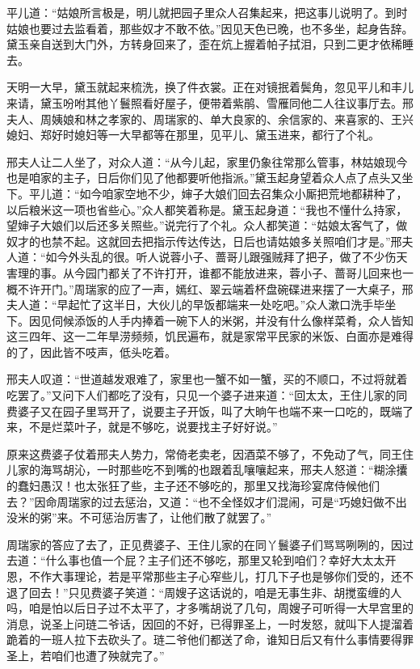 \documentclass[12pt,oneside]{book}
\begin{document}
平儿道：“姑娘所言极是，明儿就把园子里众人召集起来，把这事儿说明了。到时姑娘也要过去监看着，那些奴才不敢不依。”因见天色已晚，也不多坐，起身告辞。黛玉亲自送到大门外，方转身回来了，歪在炕上握着帕子拭泪，只到二更才依稀睡去。

天明一大早，黛玉就起来梳洗，换了件衣裳。正在对镜抿着鬓角，忽见平儿和丰儿来请，黛玉吩咐其他丫鬟照看好屋子，便带着紫鹃、雪雁同他二人往议事厅去。邢夫人、周姨娘和林之孝家的、周瑞家的、单大良家的、余信家的、来喜家的、王兴媳妇、郑好时媳妇等一大早都等在那里，见平儿、黛玉进来，都行了个礼。

邢夫人让二人坐了，对众人道：“从今儿起，家里仍象往常那么管事，林姑娘现今也是咱家的主子，日后你们见了他都要听他指派。”黛玉起身望着众人点了点头又坐下。平儿道：“如今咱家空地不少，婶子大娘们回去召集众小厮把荒地都耕种了，以后粮米这一项也省些心。”众人都笑着称是。黛玉起身道：“我也不懂什么持家，望婶子大娘们以后还多关照些。”说完行了个礼。众人都笑道：“姑娘太客气了，做奴才的也禁不起。这就回去把指示传达传达，日后也请姑娘多关照咱们才是。”邢夫人道：“如今外头乱的很。听人说蓉小子、蔷哥儿跟强贼拜了把子，做了不少伤天害理的事。从今园门都关了不许打开，谁都不能放进来，蓉小子、蔷哥儿回来也一概不许开门。”周瑞家的应了一声，嫣红、翠云端着杯盘碗碟进来摆了一大桌子，邢夫人道：“早起忙了这半日，大伙儿的早饭都端来一处吃吧。”众人漱口洗手毕坐下。因见伺候添饭的人手内捧着一碗下人的米粥，并没有什么像样菜肴，众人皆知这三四年、这一二年旱涝频频，饥民遍布，就是家常平民家的米饭、白面亦是难得的了，因此皆不吱声，低头吃着。

邢夫人叹道：“世道越发艰难了，家里也一蟹不如一蟹，买的不顺口，不过将就着吃罢了。”又问下人们都吃了没有，只见一个婆子进来道：“回太太，王住儿家的同费婆子又在园子里骂开了，说要主子开饭，叫了大晌午也端不来一口吃的，既端了来，不是烂菜叶子，就是不够吃，说要找主子好好说。”

原来这费婆子仗着邢夫人势力，常倚老卖老，因酒菜不够了，不免动了气，同王住儿家的海骂胡沁，一时那些吃不到嘴的也跟着乱嚷嚷起来，邢夫人怒道：“糊涂攮的蠢妇愚汉！也太张狂了些，主子还不够吃的，那里又找海珍宴席侍候他们去？”因命周瑞家的过去惩治，又道：“也不全怪奴才们混闹，可是“巧媳妇做不出没米的粥”来。不可惩治厉害了，让他们散了就罢了。”

周瑞家的答应了去了，正见费婆子、王住儿家的在同丫鬟婆子们骂骂咧咧的，因过去道：“什么事也值一个屁？主子们还不够吃，那里又轮到咱们？幸好大太太开恩，不作大事理论，若是平常那些主子心窄些儿，打几下子也是够你们受的，还不退了回去！”只见费婆子笑道：“周嫂子这话说的，咱是无事生非、胡搅蛮缠的人吗，咱是怕以后日子过不太平了，才多嘴胡说了几句，周嫂子可听得一大早宫里的消息，说圣上问琏二爷话，因回的不好，已得罪圣上，一时发怒，就叫下人提溜着跪着的一班人拉下去砍头了。琏二爷他们都送了命，谁知日后又有什么事情要得罪圣上，若咱们也遭了殃就完了。”
\end{document}
